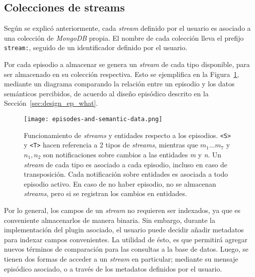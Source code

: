 \subsection{Colecciones de streams}

Según se explicó anteriormente, cada \textit{stream} definido por el usuario es asociado a una colección de \textit{MongoDB} propia. El nombre de cada colección lleva el prefijo \texttt{stream:}, seguido de un identificador definido por el usuario.

Por cada episodio a almacenar se genera un \textit{stream} de cada tipo disponible, para ser almacenado en su colección respectiva. Esto se ejemplifica en la Figura~\ref{img:episodes-and-semantic-data}, mediante un diagrama comparando la relación entre un episodio y los datos semánticos percibidos, de acuerdo al diseño episódico descrito en la Sección~\ref{sec:design_ep_what}.

\begin{figure}[!h]
	\centering
	\texttt{[image: episodes-and-semantic-data.png]}
	\caption[Funcionamiento de \textit{streams} y entidades respecto a los episodios.]
	{\small Funcionamiento de \textit{streams} y entidades respecto a los episodios. \texttt{\textless S\textgreater} y \texttt{\textless T\textgreater} hacen referencia a 2 tipos de \textit{streams}, mientras que \texttt{$m_1\ldots m_7$} y \texttt{$n_1, n_2$} son notificaciones sobre cambios a las entidades \textit{m} y \textit{n}. Un \textit{stream} de cada tipo es asociado a cada episodio, incluso en caso de transposición. Cada notificación sobre entidades es asociada a todo episodio activo. En caso de no haber episodio, no se almacenan \textit{streams}, pero si se registran los cambios en entidades.}
	\label{img:episodes-and-semantic-data}
	\end{figure}


Por lo general, los campos de un \textit{stream} no requieren ser indexados, ya que es conveniente almacenarlos de manera binaria. Sin embargo, durante la implementación del plugin asociado, el usuario puede decidir añadir metadatos para indexar campos convenientes. La utilidad de ésto, es que permitirá agregar nuevos términos de comparación para las consultas a la base de datos. Luego, se tienen dos formas de acceder a un \textit{stream} en particular; mediante su mensaje episódico asociado, o a través de los metadatos definidos por el usuario.

